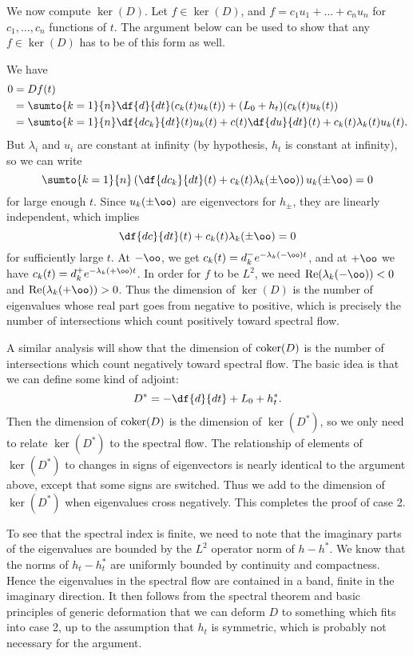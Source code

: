 We now compute $\ker(D)$. Let $f \in \ker(D)$, and $f=c_1u_1+\ldots+c_nu_n$ for $c_1,\ldots,c_n$ functions of $t$. The argument below can be used to show that any $f \in \ker(D)$ has to be of this form as well.

We have
\begin{align*}
0 & = Df(t)
\\
& = \sumto{k=1}{n} \df{d}{dt}(c_k(t)u_k(t)) + (L_0+h_t)(c_k(t)u_k(t))
\\
& = \sumto{k=1}{n} \df{dc_k}{dt}(t)u_k(t) + c(t)\df{du}{dt}(t) + c_k(t)\lambda_k(t)u_k(t).
\end{align*}
But $\lambda_i$ and $u_i$ are constant at infinity (by hypothesis, $h_t$ is constant at infinity), so we can write
\[
\sumto{k=1}{n} \left( \df{dc_k}{dt}(t) + c_k(t)\lambda_k(\pm\oo) \right) u_k(\pm\oo) = 0
\]
for large enough $t$. Since $u_k(\pm\oo)$ are eigenvectors for $h_\pm$, they are linearly independent, which implies
\[
\df{dc}{dt}(t) + c_k(t)\lambda_k(\pm\oo) = 0
\]
for sufficiently large $t$. At $-\oo$, we get $c_k(t)=d_k^-e^{-\lambda_k(-\oo)t}$, and at $+\oo$ we have $c_k(t)=d_k^+e^{-\lambda_k(+\oo)t}$. In order for $f$ to be $L^2$, we need $\text{Re}(\lambda_k(-\oo))<0$ and $\text{Re}(\lambda_k(+\oo))>0$. Thus the dimension of $\ker(D)$ is the number of eigenvalues whose real part goes from negative to positive, which is precisely the number of intersections which count positively toward spectral flow.

A similar analysis will show that the dimension of $\operatorname{\mathrm{coker}}(D)$ is the number of intersections which count negatively toward spectral flow. The basic idea is that we can define some kind of adjoint:
\[
D^* = -\df{d}{dt} + L_0 + h_t^*.
\]
Then the dimension of $\operatorname{\mathrm{coker}}(D)$ is the dimension of $\ker(D^*)$, so we only need to relate $\ker(D^*)$ to the spectral flow. The relationship of elements of $\ker(D^*)$ to changes in signs of eigenvectors is nearly identical to the argument above, except that some signs are switched. Thus we add to the dimension of $\ker(D^*)$ when eigenvalues cross negatively. This completes the proof of case 2.

\medskip

\begin{remark} To see that the spectral index is finite, we need to note that the imaginary parts of the eigenvalues are bounded by the $L^2$ operator norm of $h-h^*$. We know that the norms of $h_t-h_t^*$ are uniformly bounded by continuity and compactness. Hence the eigenvalues in the spectral flow are contained in a band, finite in the imaginary direction. It then follows from the spectral theorem and basic principles of generic deformation that we can deform $D$ to something which fits into case 2, up to the assumption that $h_t$ is symmetric, which is probably not necessary for the argument.
\end{remark}

